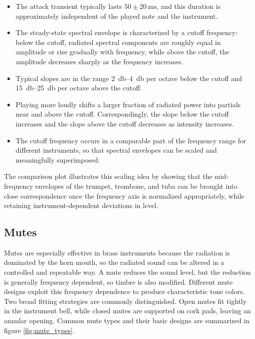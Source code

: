 \begin{itemize}
    \item The attack transient typically lasts \( 50 \pm \SI{20}{\milli\second} \), and this duration is approximately independent of the played note and the instrument. 
    \item The steady-state spectral envelope is characterized by a cutoff frequency: below the cutoff, radiated spectral components are roughly equal in amplitude or rise gradually with frequency, while above the cutoff, the amplitude decreases sharply as the frequency increases. 
    \item Typical slopes are in the range \SIrange{2}{4}{\decibel} per octave below the cutoff and \SIrange{15}{25}{\decibel} per octave above the cutoff.
    \item Playing more loudly shifts a larger fraction of radiated power into partials near and above the cutoff. Correspondingly, the slope below the cutoff increases and the slope above the cutoff decreases as intensity increases. 
    \item The cutoff frequency occurs in a comparable part of the frequency range for different instruments, so that spectral envelopes can be scaled and meaningfully superimposed. 
\end{itemize}

The comparison plot illustrates this scaling idea by showing that the mid-frequency envelopes of the trumpet, trombone, and tuba can be brought into close correspondence once the frequency axis is normalized appropriately, while retaining instrument-dependent deviations in level. 

\subsection{Mutes}

Mutes are especially effective in brass instruments because the radiation is dominated by the horn mouth, so the radiated sound can be altered in a controlled and repeatable way. A mute reduces the sound level, but the reduction is generally frequency dependent, so timbre is also modified. Different mute designs exploit this frequency dependence to produce characteristic tone colors. Two broad fitting strategies are commonly distinguished. Open mutes fit tightly in the instrument bell, while closed mutes are supported on cork pads, leaving an annular opening. Common mute types and their basic designs are summarized in figure \ref{fig:mute_types}.

